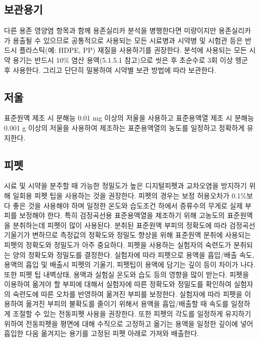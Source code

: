 \documentclass[
]{book}
\begin{document}
\hypertarget{uxbcf4uxad00uxc6a9uxae30}{%
\subsection{보관용기}\label{uxbcf4uxad00uxc6a9uxae30}}

다른 용존 영양염 항목과 함께 용존실리카 분석을 병행한다면 미량이지만 용존실리카가 용출될 수 있으므로 공통적으로 사용되는 모든 시료병과 시약병 및 시험관 등은 반드시 플라스틱(예: HDPE, PP) 재질을 사용하기를 권장한다. 분석에 사용되는 모든 시약 용기는 반드시 10\% 염산 용액(5.1.5.1 참고)으로 씻은 후 초순수로 3회 이상 헹군 후 사용한다. 그리고 단단히 밀봉하여 시약별 보관 방법에 따라 보관한다.

\hypertarget{uxc800uxc6b8}{%
\subsection{저울}\label{uxc800uxc6b8}}

표준원액 제조 시 분해능 0.01 mg 이상의 저울을 사용하고 표준용액열 제조 시 분해능 0.001 g 이상의 저울을 사용하여 제조하는 표준용액열의 농도를 일정하고 정확하게 유지한다.

\hypertarget{uxd53cuxd3ab}{%
\subsection{피펫}\label{uxd53cuxd3ab}}

시료 및 시약을 분주할 때 가능한 정밀도가 높은 디지털피펫과 교차오염을 방지하기 위해 일회용 피펫 팁을 사용하는 것을 권장한다. 피펫의 경우는 보정 허용오차가 0.1\%보다 좋은 것을 사용해야 하며 일정한 온도와 습도조건 하에서 증류수의 무게로 실제 부피를 보정해야 한다. 특히 검정곡선용 표준용액열을 제조하기 위해 고농도의 표준원액을 분취하는데 피펫이 많이 사용된다. 분취된 표준원액 부피의 정확도에 따라 검정곡선 기울기가 변하므로 측정값의 정확도와 정밀도 향상을 위해 표준원액 분취에 사용되는 피펫의 정확도와 정밀도가 아주 중요하다.
피펫을 사용하는 실험자의 숙련도가 분취되는 양의 정확도와 정밀도를 결정한다. 실험자에 따라 피펫으로 용액을 흡입/배출 속도, 용액의 흡입 및 배출시 피펫의 기울기, 피펫팁이 용액에 담기는 깊이 등이 차이가 나다. 또한 피펫 팁 내벽상태, 용액과 실험실 온도와 습도 등의 영향을 많이 받는다. 피펫을 이용하여 옮겨야 할 부피에 대해서 실험자에 따른 정확도와 정밀도를 확인하여 실험자의 숙련도에 따른 오차를 반영하여 옮겨진 부피를 보정한다. 실험자에 따라 피펫을 이용하여 옮겨진 부피의 불확도를 줄이기 위해서 용액을 흡입/배출할 때 속도를 일정하게 조절할 수 있는 전동피펫 사용을 권장한다. 또한 피펫의 각도를 일정하게 유지하기 위하여 전동피펫을 평면에 대해 수직으로 고정하고 옮기는 용액을 일정한 깊이에 넣어 흡입한 다음 옮겨지는 용기를 고정된 피펫 아래로 가져와 배출한다.
\end{document}
